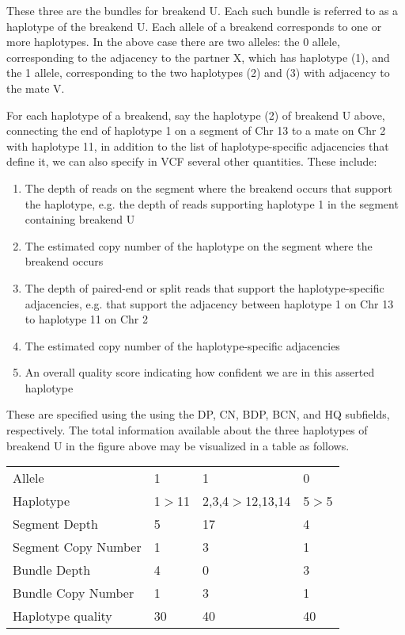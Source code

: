 \documentclass[8pt]{article}
\begin{document}
These three are the bundles for breakend U. Each such bundle is referred to as a haplotype of the breakend U. Each allele of a breakend corresponds to one or more haplotypes. In the above case there are two alleles: the 0 allele, corresponding to the adjacency to the partner X, which has haplotype (1), and the 1 allele, corresponding to the two haplotypes (2) and (3) with adjacency to the mate V.

For each haplotype of a breakend, say the haplotype (2) of breakend U above, connecting the end of haplotype 1 on a segment of Chr 13 to a mate on Chr 2 with haplotype 11, in addition to the list of haplotype-specific adjacencies that define it, we can also specify in VCF several other quantities. These include:

\begin{enumerate}
  \item The depth of reads on the segment where the breakend occurs that support the haplotype, e.g. the depth of reads supporting haplotype 1 in the segment containing breakend U
  \item The estimated copy number of the haplotype on the segment where the breakend occurs
  \item The depth of paired-end or split reads that support the haplotype-specific adjacencies, e.g. that support the adjacency between haplotype 1 on Chr 13 to haplotype 11 on Chr 2
  \item The estimated copy number of the haplotype-specific adjacencies
  \item An overall quality score indicating how confident we are in this asserted haplotype
\end{enumerate}
These are specified using the using the DP, CN, BDP, BCN, and HQ subfields, respectively. The total information available about the three haplotypes of breakend U in the figure above may be visualized in a table as follows.

\vspace{0.3cm}
\begin{tabular}{ l l l l }
Allele & 1 & 1 & 0 \\
Haplotype & 1$>$11 & 2,3,4$>$12,13,14 &	5$>$5 \\
Segment Depth & 5 & 17 & 4 \\
Segment Copy Number	& 1 & 3	& 1 \\
Bundle Depth & 4 & 0 & 3 \\
Bundle Copy Number & 1 & 3 & 1 \\
Haplotype quality & 30 & 40 & 40 \\
\end{tabular}
\end{document}
